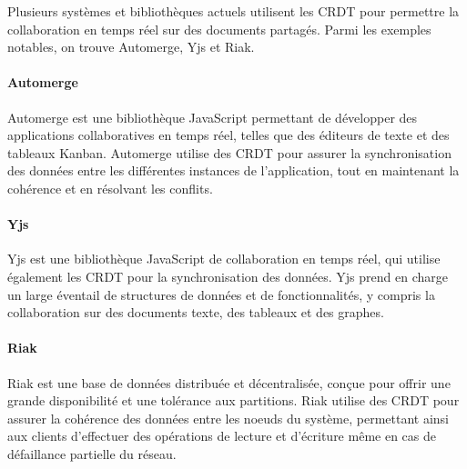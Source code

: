 Plusieurs systèmes et bibliothèques actuels utilisent les CRDT pour permettre la collaboration en temps réel sur des documents partagés. Parmi les exemples notables, on trouve Automerge, Yjs et Riak.

\paragraph{Automerge\cite{automerge}}

Automerge est une bibliothèque JavaScript permettant de développer des applications collaboratives en temps réel, telles que des éditeurs de texte et des tableaux Kanban. Automerge utilise des CRDT pour assurer la synchronisation des données entre les différentes instances de l'application, tout en maintenant la cohérence et en résolvant les conflits.

\paragraph{Yjs\cite{yjs}}

Yjs est une bibliothèque JavaScript de collaboration en temps réel, qui utilise également les CRDT pour la synchronisation des données. Yjs prend en charge un large éventail de structures de données et de fonctionnalités, y compris la collaboration sur des documents texte, des tableaux et des graphes.

\paragraph{Riak\cite{riak}}

Riak est une base de données distribuée et décentralisée, conçue pour offrir une grande disponibilité et une tolérance aux partitions. Riak utilise des CRDT pour assurer la cohérence des données entre les noeuds du système, permettant ainsi aux clients d'effectuer des opérations de lecture et d'écriture même en cas de défaillance partielle du réseau.